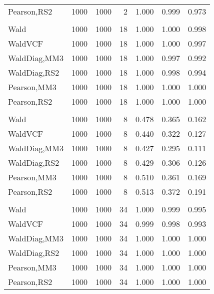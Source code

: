 \documentclass[
]{article}
\begin{document}
\begin{table}[H]
{\begin{tabular}[t]{lrrrrrr}
\hspace{1em}Pearson,RS2 & 1000 & 1000 & 2 & 1.000 & 0.999 & 0.973\\
\addlinespace[0.3em]
\multicolumn{7}{l}{\textbf{1F 15V}}\\
\hspace{1em}Wald & 1000 & 1000 & 18 & 1.000 & 1.000 & 0.998\\
\hspace{1em}WaldVCF & 1000 & 1000 & 18 & 1.000 & 1.000 & 0.997\\
\hspace{1em}WaldDiag,MM3 & 1000 & 1000 & 18 & 1.000 & 0.997 & 0.992\\
\hspace{1em}WaldDiag,RS2 & 1000 & 1000 & 18 & 1.000 & 0.998 & 0.994\\
\hspace{1em}Pearson,MM3 & 1000 & 1000 & 18 & 1.000 & 1.000 & 1.000\\
\hspace{1em}Pearson,RS2 & 1000 & 1000 & 18 & 1.000 & 1.000 & 1.000\\
\addlinespace[0.3em]
\multicolumn{7}{l}{\textbf{2F 10V}}\\
\hspace{1em}Wald & 1000 & 1000 & 8 & 0.478 & 0.365 & 0.162\\
\hspace{1em}WaldVCF & 1000 & 1000 & 8 & 0.440 & 0.322 & 0.127\\
\hspace{1em}WaldDiag,MM3 & 1000 & 1000 & 8 & 0.427 & 0.295 & 0.111\\
\hspace{1em}WaldDiag,RS2 & 1000 & 1000 & 8 & 0.429 & 0.306 & 0.126\\
\hspace{1em}Pearson,MM3 & 1000 & 1000 & 8 & 0.510 & 0.361 & 0.169\\
\hspace{1em}Pearson,RS2 & 1000 & 1000 & 8 & 0.513 & 0.372 & 0.191\\
\addlinespace[0.3em]
\multicolumn{7}{l}{\textbf{3F 15V}}\\
\hspace{1em}Wald & 1000 & 1000 & 34 & 1.000 & 0.999 & 0.995\\
\hspace{1em}WaldVCF & 1000 & 1000 & 34 & 0.999 & 0.998 & 0.993\\
\hspace{1em}WaldDiag,MM3 & 1000 & 1000 & 34 & 1.000 & 1.000 & 1.000\\
\hspace{1em}WaldDiag,RS2 & 1000 & 1000 & 34 & 1.000 & 1.000 & 1.000\\
\hspace{1em}Pearson,MM3 & 1000 & 1000 & 34 & 1.000 & 1.000 & 1.000\\
\hspace{1em}Pearson,RS2 & 1000 & 1000 & 34 & 1.000 & 1.000 & 1.000\\
\bottomrule
\end{tabular}}
\endgroup{}
\end{table}
\end{document}
